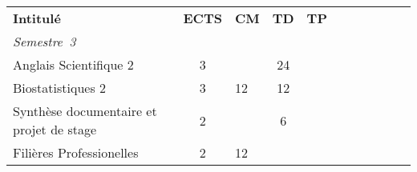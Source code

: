 


\renewcommand{\arraystretch}{1.5}%
\begin{tabular}{|m{5cm}|cm{0.75cm}|cm{0.75cm}|cm{0.75cm}|cm{0.75cm}|cm{0.75cm}|}
\cline{1-5}

\cellcolor{couleurFonce} \color{white}\bfseries Intitul\'e & \cellcolor{couleurFonce} \color{white}\bfseries ECTS & \cellcolor{couleurFonce} \color{white}\bfseries CM & \cellcolor{couleurFonce} \color{white}\bfseries TD & \cellcolor{couleurFonce} \color{white}\bfseries TP \\ \cline{1-5}
\cline{1-5} 
\multicolumn{5}{l}{\color{black} \mbox{\textit{Semestre 3}}}  \\ \cline{1-5}

\color{black} Anglais Scientifique 2 & \color{black} 3 & \color{black} & \color{black} 24 & \color{black} \\ \cline{1-5}

 \cellcolor{couleurClaire} \color{couleurTexte} Biostatistiques 2 & \cellcolor{couleurClaire} \color{couleurTexte} 3 & \cellcolor{couleurClaire} \color{couleurTexte} 12 & \cellcolor{couleurClaire} \color{couleurTexte} 12 & \cellcolor{couleurClaire} \color{couleurTexte} \\ \cline{1-5}

 \color{black} Synthèse documentaire et projet de stage & \color{black} 2 & \color{black} & \color{black} 6 & \color{black} \\ \cline{1-5}

 \cellcolor{couleurClaire} \color{couleurTexte} Filières Professionelles  & \cellcolor{couleurClaire} \color{couleurTexte} 2 & \cellcolor{couleurClaire} \color{couleurTexte} 12 & \cellcolor{couleurClaire} \color{couleurTexte} & \cellcolor{couleurClaire} \color{couleurTexte} 
\\ \cline{1-5}


\end{tabular}
